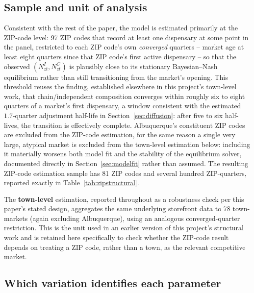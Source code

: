 \documentclass[english,12pt]{article}
\begin{document}
\subsection{Sample and unit of analysis}

Consistent with the rest of the paper, the model is estimated primarily at the ZIP-code level: 97 ZIP codes that record at least one dispensary at some point in the panel, restricted to each ZIP code's own \emph{converged} quarters -- market age at least eight quarters since that ZIP code's first active dispensary -- so that the observed $(N^I_{zt}, N^C_{zt})$ is plausibly close to its stationary Bayesian--Nash equilibrium rather than still transitioning from the market's opening. This threshold reuses the finding, established elsewhere in this project's town-level work, that chain/independent composition converges within roughly six to eight quarters of a market's first dispensary, a window consistent with the estimated $1.7$-quarter adjustment half-life in Section~\ref{sec:diffusion}: after five to six half-lives, the transition is effectively complete. Albuquerque's constituent ZIP codes are excluded from the ZIP-code estimation, for the same reason a single very large, atypical market is excluded from the town-level estimation below: including it materially worsens both model fit and the stability of the equilibrium solver, documented directly in Section~\ref{sec:modelfit} rather than assumed. The resulting ZIP-code estimation sample has 81 ZIP codes and several hundred ZIP-quarters, reported exactly in Table~\ref{tab:zipstructural}.

The \textbf{town-level} estimation, reported throughout as a robustness check per this paper's stated design, aggregates the same underlying storefront data to 78 town-markets (again excluding Albuquerque), using an analogous converged-quarter restriction. This is the unit used in an earlier version of this project's structural work and is retained here specifically to check whether the ZIP-code result depends on treating a ZIP code, rather than a town, as the relevant competitive market.

\subsection{Which variation identifies each parameter}
\end{document}
